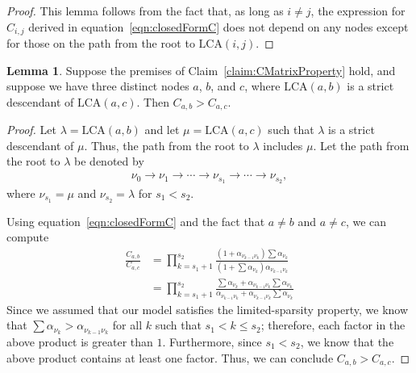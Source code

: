 \documentclass{article}
\theoremstyle{definition}
\newtheorem{lemma}[thm]{Lemma}
\begin{document}
\begin{proof}
This lemma follows from the fact that, as long as $i \neq j$, the expression for $C_{i,j}$ derived in equation~\eqref{eqn:closedFormC} does not depend on any nodes except for those on the path from the root to $\text{LCA}(i,j)$.
\end{proof}

\begin{lemma}
Suppose the premises of Claim~\ref{claim:CMatrixProperty} hold, and suppose we have three distinct nodes $a$, $b$, and $c$, where $\text{LCA}(a,b)$ is a strict descendant of $\text{LCA}(a,c)$.
Then $C_{a,b} > C_{a,c}$.
\label{lemma:greaterLCA}
\end{lemma}

\begin{proof}
Let $\lambda = \text{LCA}(a,b)$ and let $\mu = \text{LCA}(a,c)$ such that $\lambda$ is a strict descendant of $\mu$.
Thus, the path from the root to $\lambda$ includes $\mu$.
Let the path from the root to $\lambda$ be denoted by
\begin{align}
\nu_0 \to \nu_1 \to \cdots \to \nu_{s_1} \to \cdots \to \nu_{s_2},
\end{align}
where $\nu_{s_1} = \mu$ and $\nu_{s_2} = \lambda$ for $s_1 < s_2$.

Using equation~\eqref{eqn:closedFormC} and the fact that $a \neq b$ and $a \neq c$, we can compute
\begin{align}
\frac{C_{a,b}}{C_{a,c}}
&=
\prod_{k=s_1+1}^{s_2}
\frac
  { \left( 1 + \alpha_{\nu_{k-1} \nu_k} \right) \sum \alpha_{\nu_k} }
  { \left( 1 + \sum \alpha_{\nu_k} \right) \alpha_{\nu_{k-1} \nu_k} }
\\
&=
\prod_{k=s_1+1}^{s_2}
\frac
  { \sum \alpha_{\nu_k} + \alpha_{\nu_{k-1} \nu_k} \sum \alpha_{\nu_k} }
  { \alpha_{\nu_{k-1} \nu_k} + \alpha_{\nu_{k-1} \nu_k} \sum \alpha_{\nu_k} }
\end{align}
%
Since we assumed that our model satisfies the limited-sparsity property, we know that $\sum \alpha_{\nu_k} > \alpha_{\nu_{k-1} \nu_k}$ for all $k$ such that $s_1 < k \leq s_2$; therefore, each factor in the above product is greater than $1$.
Furthermore, since $s_1 < s_2$, we know that the above product contains at least one factor.
Thus, we can conclude $C_{a,b} > C_{a,c}$.
\end{proof}
\end{document}
